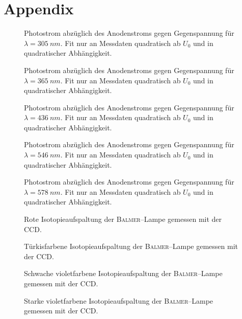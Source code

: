 \documentclass[sn-mathphys-num,iicol]{sn-jnl}
\theoremstyle{thmstyleone}
\theoremstyle{thmstyletwo}
\theoremstyle{thmstylethree}
\begin{document}
\section{Appendix}
\begin{figure}[h]
        \centering
        \resizebox{.5\textwidth}{!}{}
        \caption{Photostrom abzüglich des Anodenstroms gegen Gegenspannung für $\lambda =\SI{305}{n m}$. Fit nur an Messdaten quadratisch ab $U_0$ und in quadratischer Abhängigkeit.} \label{fig:photo_auswertung_305}
\end{figure}
\begin{figure}[h]
        \centering
        \resizebox{.5\textwidth}{!}{}
        \caption{Photostrom abzüglich des Anodenstroms gegen Gegenspannung für $\lambda =\SI{365}{n m}$. Fit nur an Messdaten quadratisch ab $U_0$ und in quadratischer Abhängigkeit.}
\end{figure}
\begin{figure}[h]
        \centering
        \resizebox{.5\textwidth}{!}{}
        \caption{Photostrom abzüglich des Anodenstroms gegen Gegenspannung für $\lambda =\SI{436}{n m}$. Fit nur an Messdaten quadratisch ab $U_0$ und in quadratischer Abhängigkeit.}
\end{figure}
\begin{figure}[h]
        \centering
        \resizebox{.5\textwidth}{!}{}
        \caption{Photostrom abzüglich des Anodenstroms gegen Gegenspannung für $\lambda =\SI{546}{n m}$. Fit nur an Messdaten quadratisch ab $U_0$ und in quadratischer Abhängigkeit.}
\end{figure}
\begin{figure}[h]
        \centering
        \resizebox{.5\textwidth}{!}{}
        \caption{Photostrom abzüglich des Anodenstroms gegen Gegenspannung für $\lambda =\SI{578}{n m}$. Fit nur an Messdaten quadratisch ab $U_0$ und in quadratischer Abhängigkeit.} \label{fig:photo_auswertung_578}
\end{figure}
\begin{figure}[h]
        \centering
        \resizebox{.5\textwidth}{!}{}
        \caption{Rote Isotopieaufspaltung der \textsc{Balmer}--Lampe gemessen mit der CCD.} \label{fig:ccdrot}
\end{figure}
\begin{figure}[h]
        \centering
        \resizebox{.5\textwidth}{!}{}
        \caption{Türkisfarbene Isotopieaufspaltung der \textsc{Balmer}--Lampe gemessen mit der CCD.} \label{fig:ccdtürkis}
\end{figure}
\begin{figure}[h]
        \centering
        \resizebox{.5\textwidth}{!}{}
        \caption{Schwache violetfarbene Isotopieaufspaltung der \textsc{Balmer}--Lampe gemessen mit der CCD.} \label{fig:ccdvioletschwach}
\end{figure}
\begin{figure}[h]
        \centering
        \resizebox{.5\textwidth}{!}{}
        \caption{Starke violetfarbene Isotopieaufspaltung der \textsc{Balmer}--Lampe gemessen mit der CCD.} \label{fig:ccdvioletstark}
\end{figure}

\clearpage

\end{document}
